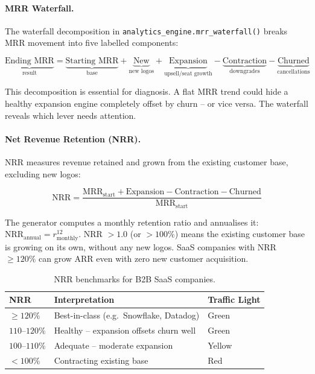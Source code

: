 \paragraph{MRR Waterfall.}
The waterfall decomposition in \texttt{analytics\_engine.mrr\_waterfall()} breaks MRR movement into five labelled components:

\begin{equation}
  \underbrace{\text{Ending MRR}}_{\text{result}} =
  \underbrace{\text{Starting MRR}}_{\text{base}} +
  \underbrace{\text{New}}_{\text{new logos}} +
  \underbrace{\text{Expansion}}_{\text{upsell/seat growth}} -
  \underbrace{\text{Contraction}}_{\text{downgrades}} -
  \underbrace{\text{Churned}}_{\text{cancellations}}
\end{equation}

This decomposition is essential for diagnosis. A flat MRR trend could hide a healthy expansion engine completely offset by churn -- or vice versa. The waterfall reveals which lever needs attention.

\paragraph{Net Revenue Retention (NRR).}
NRR measures revenue retained and grown from the existing customer base, excluding new logos:

\begin{equation}
  \text{NRR} = \frac{\text{MRR}_{\text{start}} + \text{Expansion} - \text{Contraction} - \text{Churned}}{\text{MRR}_{\text{start}}}
\end{equation}

The generator computes a monthly retention ratio and annualises it: \(\text{NRR}_{\text{annual}} = r_{\text{monthly}}^{12}\). NRR $> 1.0$ (or \(>100\%\)) means the existing customer base is growing on its own, without any new logos. SaaS companies with NRR \(\geq 120\%\) can grow ARR even with zero new customer acquisition.

\begin{table}[h]
\centering
\caption{NRR benchmarks for B2B SaaS companies.}
\begin{tabular}{lll}
\toprule
\textbf{NRR} & \textbf{Interpretation} & \textbf{Traffic Light} \\
\midrule
$\geq 120\%$ & Best-in-class (e.g.\ Snowflake, Datadog) & Green \\
$110$--$120\%$ & Healthy -- expansion offsets churn well & Green \\
$100$--$110\%$ & Adequate -- moderate expansion & Yellow \\
$< 100\%$    & Contracting existing base & Red \\
\bottomrule
\end{tabular}
\label{tab:nrr-benchmarks}
\end{table}

